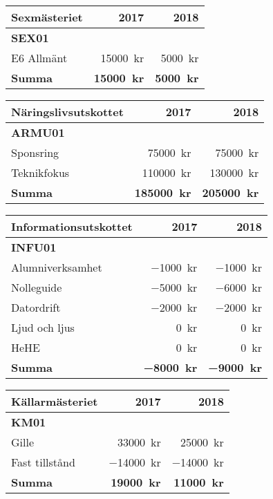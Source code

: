 \documentclass[../_main/handlingar.tex]{subfiles}
\begin{document}
\begin{tabularx}{10cm}{X r r}
    \textbf{\large Sexmästeriet} & \textbf{2017} & \textbf{2018} \\
    \hline
    \textbf{SEX01} \\
    E6 Allmänt & \SI{15000}{kr} & \SI{5000}{kr} \\
    \hline
    \textbf{Summa} & \textbf{\SI{15000}{kr}} & \textbf{\SI{5000}{kr}} \\
\end{tabularx}

\begin{tabularx}{10cm}{X r r}
    \textbf{\large Näringslivsutskottet} & \textbf{2017} & \textbf{2018} \\
    \hline
    \textbf{ARMU01} \\
    Sponsring & \SI{75000}{kr} & \SI{75000}{kr} \\
    Teknikfokus & \SI{110000}{kr} & \SI{130000}{kr} \\
    \hline
    \textbf{Summa} & \textbf{\SI{185000}{kr}} & \textbf{\SI{205000}{kr}} \\
\end{tabularx}

\begin{tabularx}{10cm}{X r r}
    \textbf{\large Informationsutskottet} & \textbf{2017} & \textbf{2018} \\
    \hline
    \textbf{INFU01} \\
    Alumniverksamhet & \SI{-1000}{kr} & \SI{-1000}{kr} \\
    Nolleguide & \SI{-5000}{kr} & \SI{-6000}{kr} \\
    Datordrift & \SI{-2000}{kr} & \SI{-2000}{kr} \\
    Ljud och ljus & \SI{0}{kr} & \SI{0}{kr} \\
    HeHE & \SI{0}{kr} & \SI{0}{kr} \\
    \hline
    \textbf{Summa} & \textbf{\SI{-8000}{kr}} & \textbf{\SI{-9000}{kr}} \\
\end{tabularx}

\begin{tabularx}{10cm}{X r r}
    \textbf{\large Källarmästeriet} & \textbf{2017} & \textbf{2018} \\
    \hline
    \textbf{KM01} \\
    Gille & \SI{33000}{kr} & \SI{25000}{kr} \\
    Fast tillstånd & \SI{-14000}{kr} & \SI{-14000}{kr} \\
    \hline
    \textbf{Summa} & \textbf{\SI{19000}{kr}} & \textbf{\SI{11000}{kr}} \\
\end{tabularx}
\end{document}
